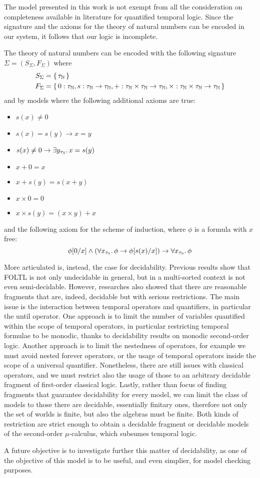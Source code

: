 The model presented in this work is not exempt from all the consideration on completeness available in literature for
quantified temporal logic. Since the signature and the axioms for the theory of natural numbers can be encoded in our
system, it follows that our logic is incomplete.
\begin{example}
  The theory of natural numbers can be encoded with the following signature $\Sigma = (S_\Sigma, F_\Sigma)$ where
  \[
    \begin{split}
      S_\Sigma &= \set{\tau_\mathbb{N}} \\
      F_\Sigma &= \set{0 : \tau_\mathbb{N}, s : \tau_\mathbb{N} \to \tau_\mathbb{N}, + : \tau_\mathbb{N} \times
      \tau_\mathbb{N} \to \tau_\mathbb{N}, \times : \tau_\mathbb{N} \times \tau_\mathbb{N} \to \tau_\mathbb{N}}
    \end{split}
  \]
  and by models where the following additional axioms are true:
  \begin{itemize}
    \item $s(x) \neq 0$
    \item $s(x) = s(y) \to x = y$
    \item $s(x) \neq 0 \to \exists {y_{\tau_\mathbb{N}}} \ldotp {x = s(y)}$
    \item $x + 0 = x$
    \item $x + s(y) = s(x + y)$
    \item $x \times 0 = 0$
    \item $x \times s(y) = (x \times y) + x$
  \end{itemize}
  and the following axiom for the scheme of induction, where $\phi$ is a formula with $x$ free:
  \[
    \phi[0/x] \land (\forall {x_{\tau_\mathbb{N}}} \ldotp {\phi \to \phi[s(x)/x]}) \to \forall {x_{\tau_\mathbb{N}}} \ldotp {\phi}
  \]
\end{example}

More articulated is, instead, the case for decidability. Previous results show that \ac{FOLTL} is not only undecidable in
general, but in a multi-sorted context is not even semi-decidable. However, researches also showed that there are
reasonable fragments that are, indeed, decidable but with serious restrictions. The main issue is the interaction
between temporal operators and quantifiers, in particular the until operator. One approach is to limit the number of
variables quantified within the scope of temporal operators, in particular restricting temporal formulae to be monodic,
thanks to decidability results on monodic second-order logic. Another approach is to limit the nestedness of operators,
for example we must avoid nested forever operators, or the usage of temporal operators inside the scope of a universal
quantifier. Nonetheless, there are still issues with classical operators, and we must restrict also the usage of those
to an arbitrary decidable fragment of first-order classical logic. Lastly, rather than focus of finding fragments that
guarantee decidability for every model, we can limit the class of models to those there are decidable, essentially
finitary ones, therefore not only the set of worlds is finite, but also the algebras must be finite. Both kinds of restriction
are strict enough to obtain a decidable fragment or decidable models of the second-order $\mu$-calculus, which subsumes temporal logic.

A future objective is to investigate further this matter of decidability, as one of the objective of this model is to be
useful, and even simplier, for model checking purposes.

